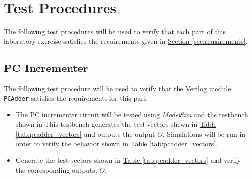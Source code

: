 \section{Test Procedures} %
\label{sec:test_procedures}

The following test procedures will be used to verify that each part of this laboratory exercise satisfies the requirements given in \hyperref[sec:requirements]{Section \ref*{sec:requirements}}.

\subsection{PC Incrementer} %
\label{sub:pc_incrementer}

The following test procedure will be used to verify that the Verilog module \verb|PCAdder| satisfies the requirements for this part.

\begin{itemize}
    \item The PC incrementer circuit will be tested using \emph{ModelSim} and the testbench shown in %
    This testbench generates the test vectors shown in \hyperref[tab:pcadder_vectors]{Table \ref*{tab:pcadder_vectors}} and outputs the output $O$.
    Simulations will be run in order to verify the behavior shown in \hyperref[tab:pcadder_vectors]{Table \ref*{tab:pcadder_vectors}}.
    \item Generate the test vectors shown in \hyperref[tab:pcadder_vectors]{Table \ref*{tab:pcadder_vectors}} and verify the corresponding outputs, $O$.
\end{itemize}


